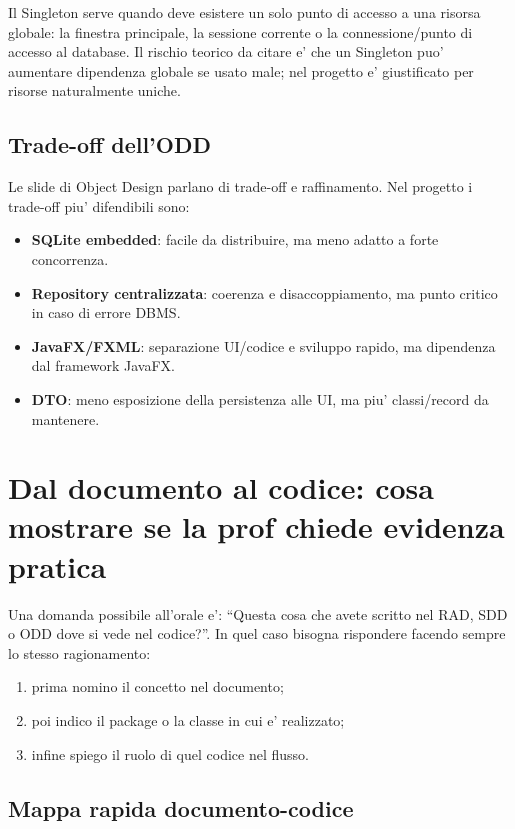 ﻿\documentclass[11pt,a4paper]{article}
\newcommand{\term}[1]{\textbf{#1}}
\begin{document}
Il Singleton serve quando deve esistere un solo punto di accesso a una risorsa globale:
la finestra principale, la sessione corrente o la connessione/punto di accesso al database.
Il rischio teorico da citare e' che un Singleton puo' aumentare dipendenza globale se usato
male; nel progetto e' giustificato per risorse naturalmente uniche.

\subsection{Trade-off dell'ODD}

Le slide di Object Design parlano di trade-off e raffinamento. Nel progetto i trade-off piu'
difendibili sono:
\begin{itemize}
  \item \term{SQLite embedded}: facile da distribuire, ma meno adatto a forte concorrenza.
  \item \term{Repository centralizzata}: coerenza e disaccoppiamento, ma punto critico
  in caso di errore DBMS.
  \item \term{JavaFX/FXML}: separazione UI/codice e sviluppo rapido, ma dipendenza dal
  framework JavaFX.
  \item \term{DTO}: meno esposizione della persistenza alle UI, ma piu' classi/record da
  mantenere.
\end{itemize}

\section{Dal documento al codice: cosa mostrare se la prof chiede evidenza pratica}

Una domanda possibile all'orale e': ``Questa cosa che avete scritto nel RAD, SDD o ODD
dove si vede nel codice?''. In quel caso bisogna rispondere facendo sempre lo stesso
ragionamento:
\begin{enumerate}
  \item prima nomino il concetto nel documento;
  \item poi indico il package o la classe in cui e' realizzato;
  \item infine spiego il ruolo di quel codice nel flusso.
\end{enumerate}

\subsection{Mappa rapida documento-codice}
\end{document}
